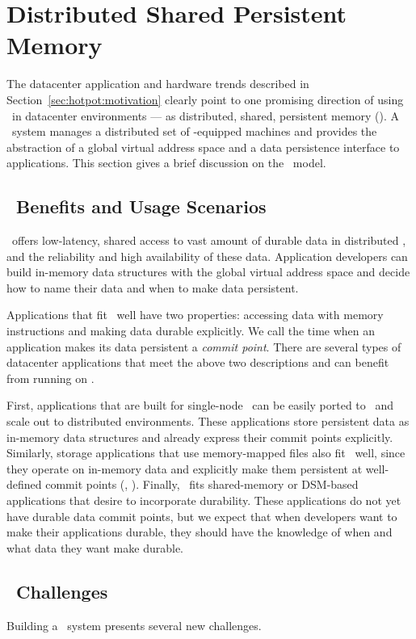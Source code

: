 \section{Distributed Shared Persistent Memory}
\label{sec:hotpot:dspm}

The datacenter application and hardware trends described in Section~\ref{sec:hotpot:motivation} 
clearly point to one promising direction of using \nvm\ in datacenter environments --- 
as distributed, shared, persistent memory (\dsnvm).
A \dsnvm\ system manages a distributed set of \nvm{}-equipped machines  
and provides the abstraction of a global virtual address space and a data persistence interface to applications.
This section gives a brief discussion on the \dsnvm\ model.

\subsection{\dsnvm\ Benefits and Usage Scenarios}
\dsnvm\ offers low-latency, shared access to vast amount of durable data in distributed \nvm,
and the reliability and high availability of these data.
Application developers can build in-memory data structures with the global virtual address space 
and decide how to name their data and when to make data persistent.

Applications that fit \dsnvm\ well have two properties:
accessing data with memory instructions and making data durable explicitly.
We call the time when an application makes its data persistent a {\em commit point}.
There are several types of datacenter applications that meet the above two descriptions and can benefit from running on \dsnvm.

First, applications that are built for single-node \nvm\
can be easily ported to \dsnvm\ and scale out to distributed environments.
These applications store persistent data as in-memory data structures 
and already express their commit points explicitly.
Similarly, storage applications that use memory-mapped files also fit \dsnvm\ well,
since they operate on in-memory data and explicitly make them persistent at well-defined commit points (\ie, \msync).
Finally, \dsnvm\ fits shared-memory or DSM-based applications that desire to incorporate durability.
These applications do not yet have durable data commit points,
but we expect that when developers want to make their applications durable, 
they should have the knowledge of when and what data they want make durable.

\subsection{\dsnvm\ Challenges}
\label{sec:hotpot:challenges}
Building a \dsnvm\ system presents several new challenges.

